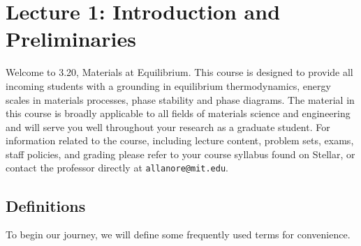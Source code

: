 \documentclass[12pt]{article}
\def\dbar{{\mathchar'26\mkern-12mu d}}
\begin{document}

\tableofcontents
\section{Lecture 1: Introduction and Preliminaries}

Welcome to 3.20, Materials at Equilibrium.  This course is designed to provide all incoming students with a grounding in equilibrium thermodynamics, energy scales in materials processes, phase stability and phase diagrams.  The material in this course is broadly applicable to all fields of materials science and engineering and will serve you well throughout your research as a graduate student.  For information related to the course, including lecture content, problem sets, exams, staff policies, and grading please refer to your course syllabus found on Stellar, or contact the professor directly at \texttt{allanore@mit.edu}.

\subsection{Definitions}
To begin our journey, we will define some frequently used terms for convenience.
\end{document}
